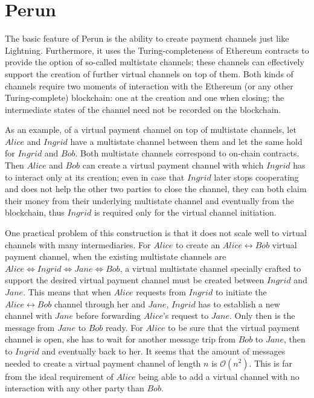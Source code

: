 \section{Perun}
  The basic feature of Perun is the ability to create payment channels just like
  Lightning. Furthermore, it uses the Turing-completeness of Ethereum contracts to provide
  the option of so-called multistate channels; these channels can effectively support the
  creation of further virtual channels on top of them. Both kinds of channels require two
  moments of interaction with the Ethereum (or any other Turing-complete) blockchain: one
  at the creation and one when closing; the intermediate states of the channel need not be
  recorded on the blockchain.

  As an example, of a virtual payment channel on top of multistate channels, let $Alice$
  and $Ingrid$ have a multistate channel between them and let the same hold for $Ingrid$
  and $Bob$. Both multistate channels correspond to on-chain contracts. Then $Alice$ and
  $Bob$ can create a virtual payment channel with which $Ingrid$ has to interact only at
  its creation; even in case that $Ingrid$ later stops cooperating and does not help the
  other two parties to close the channel, they can both claim their money from their
  underlying multistate channel and eventually from the blockchain, thus $Ingrid$ is
  required only for the virtual channel initiation.

  One practical problem of this construction is that it does not scale well to virtual
  channels with many intermediaries. For $Alice$ to create an $Alice \leftrightarrow Bob$
  virtual payment channel, when the existing multistate channels are $Alice
  \Leftrightarrow Ingrid \Leftrightarrow Jane \Leftrightarrow Bob$, a virtual multistate
  channel specially crafted to support the desired virtual payment channel must be created
  between $Ingrid$ and $Jane$. This means that when $Alice$ requests from $Ingrid$ to
  initiate the $Alice \leftrightarrow Bob$ channel through her and $Jane$, $Ingrid$ has to
  establish a new channel with $Jane$ before forwarding $Alice$'s request to $Jane$. Only
  then is the message from $Jane$ to $Bob$ ready. For $Alice$ to be sure that the virtual
  payment channel is open, she has to wait for another message trip from $Bob$ to $Jane$,
  then to $Ingrid$ and eventually back to her. It seems that the amount of messages needed
  to create a virtual payment channel of length $n$ is $\mathcal{O}\left(n^2\right)$. This
  is far from the ideal requirement of $Alice$ being able to add a virtual channel with no
  interaction with any other party than $Bob$.
